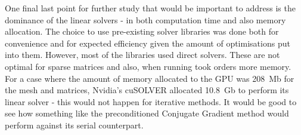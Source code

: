 One final last point for further study that would be important to address is the dominance of the linear solvers - in both computation time and also memory allocation. The choice to use pre-existing solver libraries was done both for convenience and for expected efficiency given the amount of optimisations put into them. However, most of the libraries used direct solvers. These are not optimal for sparse matrices and also, when running took orders more memory. For a case where the amount of memory allocated to the GPU was 208~Mb for the mesh and matrices, Nvidia's cuSOLVER allocated 10.8~Gb to perform its linear solver - this would not happen for iterative methods. It would be good to see how something like the preconditioned Conjugate Gradient method would perform against its serial counterpart.